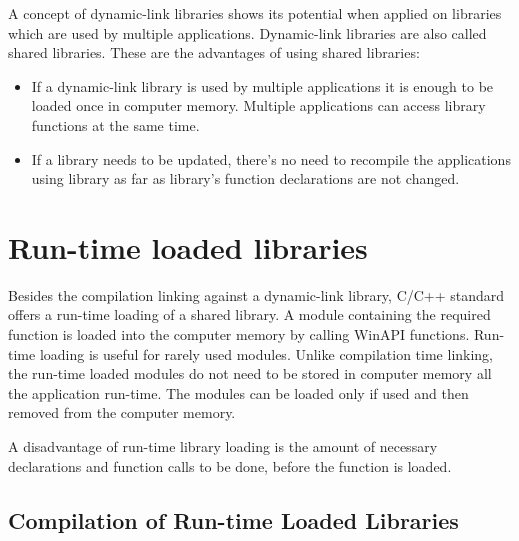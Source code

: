 
A concept of dynamic-link libraries shows its potential when applied on libraries which are used by multiple applications. Dynamic-link libraries are also called shared libraries. These are the advantages of using shared libraries:

\begin{itemize}
\item If a dynamic-link library is used by multiple applications it is enough to be loaded once in computer memory. Multiple applications can access library functions at the same time.
\item If a library needs to be updated, there's no need to recompile the applications using library as far as library's function declarations are not changed.
\end{itemize}


\section{Run-time loaded libraries}

Besides the compilation linking against a dynamic-link library, C/C++ standard offers a run-time loading of a shared library. A module containing the required function is loaded into the computer memory by calling WinAPI functions. Run-time loading is useful for rarely used modules. Unlike compilation time linking, the run-time loaded modules do not need to be stored in computer memory all the application run-time. The modules can be loaded only if used and then removed from the computer memory.

A disadvantage of run-time library loading is the amount of necessary declarations and function calls to be done, before the function is loaded.

\subsection{Compilation of Run-time Loaded Libraries}


